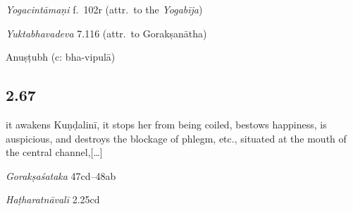 \begin{ekdosis}
\begin{testimonia}[hp02_066]
\emph{Yogacintāmaṇi} f.~102r (attr.~to the \emph{Yogabīja})

\begin{versinnote}
\end{versinnote}

\emph{Yuktabhavadeva} 7.116 (attr.~to Gorakṣanātha)
\begin{versinnote}
\end{versinnote}

\end{testimonia}


\begin{metre}[hp02_066]
Anuṣṭubh (c: bha-vipulā)
\end{metre}

\subsection*{2.67}
\begin{translation}[hp02_067]
[\ldots] it awakens Kuṇḍalinī, it stops her from being coiled, bestows happiness, is auspicious, and destroys the blockage of phlegm, etc., situated at the mouth of the central channel,[\dots]
\end{translation}

\begin{sources}[hp02_067]
\emph{Gorakṣaśataka} 47cd–48ab

\begin{versinnote}
\end{versinnote}
\end{sources}

\begin{testimonia}[hp02_067]
\emph{Haṭharatnāvalī} 2.25cd

\begin{versinnote}
\end{versinnote}


\end{testimonia}
\end{ekdosis}
